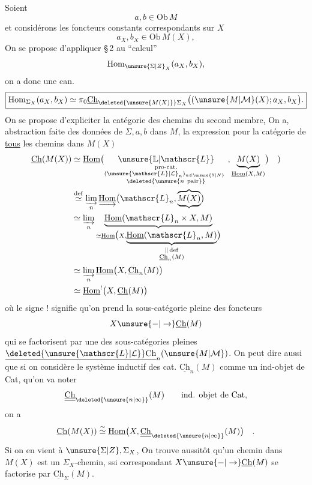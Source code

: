 Soient
\[
a,b\in\mathrm{Ob}\,M
\]
et considérons les foncteurs constants correspondants
sur $X$
\[
a_X,b_X\in\mathrm{Ob}\,M(X),
\]
On se propose d'appliquer    \S\,2
au ``calcul'' 
\[
\operatorname{Hom}_{\unsure{\Sigma|Z}_X}(a_X,b_X),
\]
on a donc une  can.
\[
\boxed{\operatorname{Hom}_{\Sigma_X}(a_X,b_X)\simeq\pi_0\underline{\mathrm{Ch}}_{\deleted{\unsure{M(X)}}\Sigma_X}\bigl((\unsure{M|\mathcal{M}}(X);a_X,b_X\bigr).}
\]
On se propose d'expliciter la catégorie des
chemins du second membre, On a, abstraction
faite des données de $\Sigma,a,b$ dans $M$, la
expression pour la catégorie de \uline{tous} les
chemins dans $M(X)$
\[
\begin{aligned}
\underline{\mathrm{Ch}}(M(X))
&\simeq\underline{\mathrm{Hom}}\bigl(
\underset{\substack{\text{pro-cat.}\\(\unsure{\mathscr{L}|\mathcal{L}}_n)_{n\in\unsure{\mathbb{N}|N}}\ \\ \deleted{\unsure{n\ \mathrm{pair}}}}}{\unsure{\mathbb{L}|\mathscr{L}}},
\underbrace{M(X)}_{\underline{\mathrm{Hom}}(X,M)}\bigr)\quad )\\
&\overset{\mathrm{def}}{\simeq}\varinjlim_n
\underrightarrow{\underline{\mathrm{Hom}}}\bigl(\mathscr{L}_n,\underbrace{\overbrace{M(X)}}\bigr)\\
&\simeq\varinjlim_n\underbrace{\underline{\mathrm{Hom}}(\mathscr{L}_n\times X,M)}_{
\simeq\underline{\mathrm{Hom}}\bigl(X,
\underbrace{\underline{\mathrm{Hom}}(\mathscr{L}_n,M)}_{\substack{\Vert\,\mathrm{def}\\\underline{\mathrm{Ch}}_n(M)}}\bigr)}\\
&\simeq\varinjlim_n\underline{\mathrm{Hom}}\bigl(X,\underline{\mathrm{Ch}}_n(M)\bigr)\\
&\simeq\underline{\mathrm{Hom}}^!\bigl(X,\underline{\mathrm{Ch}}(M)\bigr)
\end{aligned}
\]
où le signe $!$ signifie qu'on prend la sous-catégorie pleine des foncteurs 
\[
X\unsure{\mathord{-}|\to}\underline{\mathrm{Ch}}(M)
\]
qui se factorisent par une des sous-catégories
pleines $\underline{\deleted{\unsure{\mathscr{L}|\mathcal{L}}}\mathrm{Ch}}_n(\unsure{M|\mathcal{M}})$. On peut dire aussi que
si on considère le système inductif des
cat. $\underline{\mathrm{Ch}}_n(M)$ comme un ind-objet
de Cat,  qu'on va noter
\[
\underline{\underline{\mathrm{Ch}}}_{\deleted{\unsure{n|\infty}}}(M)
\qquad\text{ind. objet de Cat},
\]
on a
\[
\underline{\mathrm{Ch}}(M(X))\overset{\sim}{\simeq}
\underline{\mathrm{Hom}}\bigl(X,\underline{\underline{\mathrm{Ch}}}_{\deleted{\unsure{n|\infty}}}(M)\bigr)\quad .
\]
Si on en vient  à $\unsure{\Sigma|Z},\Sigma_X$, On trouve
aussitôt qu'un chemin dans $M(X)$ est un
$\Sigma_X$-chemin, ssi   correspondant
$X\unsure{\mathord{-}|\to}\underline{\mathrm{Ch}}(M)$ se factorise par $\underline{\mathrm{Ch}}_\Sigma(M)$.

